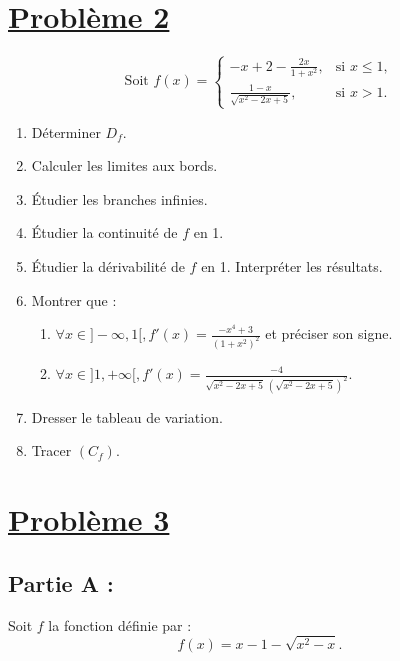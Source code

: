 \documentclass[12pt]{article}
\begin{document}
\section*{\underline{Problème 2}}

\[\text{Soit }
f(x) =
\begin{cases} 
    -x + 2 - \frac{2x}{1 + x^2}, & \text{si } x \leq 1, \\
    \frac{1 - x}{\sqrt{x^2 - 2x + 5}}, & \text{si } x > 1.
\end{cases}
\]

\begin{enumerate}
    \item Déterminer \( D_f \).
    \item Calculer les limites aux bords.
    \item Étudier les branches infinies.
    \item Étudier la continuité de \( f \) en 1.
    \item Étudier la dérivabilité de \( f \) en 1. Interpréter les résultats.
    \item Montrer que :
    \begin{enumerate}
        \item \( \forall x \in ]-\infty, 1[, f'(x) = \frac{-x^4 + 3}{(1 + x^2)^2} \) et préciser son signe.
        \item \( \forall x \in ]1, +\infty[, f'(x) = \frac{-4}{\sqrt{x^2 - 2x + 5} \, (\sqrt{x^2 - 2x + 5})^2} \).
    \end{enumerate}
    \item Dresser le tableau de variation.
    \item Tracer \( (C_f) \).
\end{enumerate}


\section*{\underline{Problème 3}}

\subsection*{Partie A :}

Soit \( f \) la fonction définie par :
\[
f(x) = x - 1 - \sqrt{x^2 - x}.
\]
\end{document}
